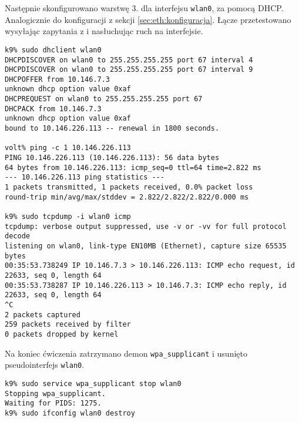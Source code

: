 Następnie skonfigurowano warstwę 3. dla interfejsu \texttt{wlan0}, za pomocą
DHCP. Analogicznie do konfiguracji z sekcji \ref{sec:eth:konfiguracja}. Łącze
przetestowano wysyłając zapytania z \volt{} i nasłuchując ruch na interfejsie.

\begin{lstlisting}
k9% sudo dhclient wlan0
DHCPDISCOVER on wlan0 to 255.255.255.255 port 67 interval 4
DHCPDISCOVER on wlan0 to 255.255.255.255 port 67 interval 9
DHCPOFFER from 10.146.7.3
unknown dhcp option value 0xaf
DHCPREQUEST on wlan0 to 255.255.255.255 port 67
DHCPACK from 10.146.7.3
unknown dhcp option value 0xaf
bound to 10.146.226.113 -- renewal in 1800 seconds.

volt% ping -c 1 10.146.226.113
PING 10.146.226.113 (10.146.226.113): 56 data bytes
64 bytes from 10.146.226.113: icmp_seq=0 ttl=64 time=2.822 ms
--- 10.146.226.113 ping statistics ---
1 packets transmitted, 1 packets received, 0.0% packet loss
round-trip min/avg/max/stddev = 2.822/2.822/2.822/0.000 ms

k9% sudo tcpdump -i wlan0 icmp
tcpdump: verbose output suppressed, use -v or -vv for full protocol decode
listening on wlan0, link-type EN10MB (Ethernet), capture size 65535 bytes
00:35:53.738249 IP 10.146.7.3 > 10.146.226.113: ICMP echo request, id 22633, seq 0, length 64
00:35:53.738287 IP 10.146.226.113 > 10.146.7.3: ICMP echo reply, id 22633, seq 0, length 64
^C
2 packets captured
259 packets received by filter
0 packets dropped by kernel
\end{lstlisting}

Na koniec ćwiczenia zatrzymano demon \texttt{wpa\_supplicant} i usunięto
pseudo\dywiz interfejs \texttt{wlan0}.

\begin{lstlisting}
k9% sudo service wpa_supplicant stop wlan0
Stopping wpa_supplicant.
Waiting for PIDS: 1275.
k9% sudo ifconfig wlan0 destroy
\end{lstlisting}

